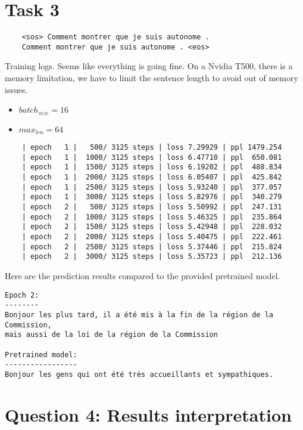 \documentclass[a4paper]{article}
\begin{document}
\section*{Task 3}
\begin{verbatim}
    <sos> Comment montrer que je suis autonome .
    Comment montrer que je suis autonome . <eos>
\end{verbatim}

Training logs. Seems like everything is going fine.
On a Nvidia T500, there is a memory limitation, we have to limit the sentence length to avoid out of memory issues.


\begin{itemize}
    \item $batch_{size} = 16$
    \item $max_{len} = 64$
\end{itemize}

\begin{verbatim}
    | epoch   1 |   500/ 3125 steps | loss 7.29929 | ppl 1479.254
    | epoch   1 |  1000/ 3125 steps | loss 6.47710 | ppl  650.081
    | epoch   1 |  1500/ 3125 steps | loss 6.19202 | ppl  488.834
    | epoch   1 |  2000/ 3125 steps | loss 6.05407 | ppl  425.842
    | epoch   1 |  2500/ 3125 steps | loss 5.93240 | ppl  377.057
    | epoch   1 |  3000/ 3125 steps | loss 5.82976 | ppl  340.279
    | epoch   2 |   500/ 3125 steps | loss 5.50992 | ppl  247.131
    | epoch   2 |  1000/ 3125 steps | loss 5.46325 | ppl  235.864
    | epoch   2 |  1500/ 3125 steps | loss 5.42948 | ppl  228.032
    | epoch   2 |  2000/ 3125 steps | loss 5.40475 | ppl  222.461
    | epoch   2 |  2500/ 3125 steps | loss 5.37446 | ppl  215.824
    | epoch   2 |  3000/ 3125 steps | loss 5.35723 | ppl  212.136
\end{verbatim}



Here are the prediction results compared to the provided pretrained model.

\begin{verbatim}
Epoch 2:
--------
Bonjour les plus tard, il a été mis à la fin de la région de la Commission,
mais aussi de la loi de la région de la Commission

Pretrained model:
-----------------
Bonjour les gens qui ont été très accueillants et sympathiques.
\end{verbatim}


\section{Question 4: Results interpretation}
\end{document}
